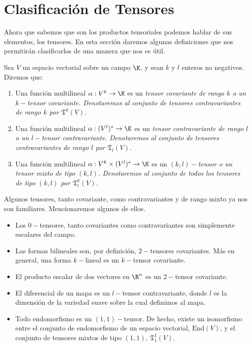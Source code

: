 \section{Clasificación de Tensores}
\label{Sección: Clasificación de Tensores}
Ahora que sabemos que son los productos tensoriales podemos hablar de sus
elementos, los tensores. En esta sección daremos algunas definiciones que
nos permitirán clasificarlos de una manera que nos es útil.

\begin{definition}
	Sea $V$ un espacio vectorial sobre un campo $\K$, y sean $k$ y $l$ enteros no
	negativos. Diremos que:
	\begin{enumerate}
		\item Una función multilineal $\alpha: V^{k} \to \K$ es un \it{tensor
			      covariante de rango $k$} o un \it{$k-$tensor covariante}.
		      Denotaremos al conjunto de tensores contravariantes de rango $k$ por
		      $\mathfrak{T}^k(V)$.
		\item Una función multilineal $\alpha: (V^l)^* \to \K$ es un \it{tensor
			      contravariante de rango $l$} o un \it{$l-$tensor contravariante}.
		      Denotaremos al conjunto de tensores contravariantes de rango $l$ por
		      $\mathfrak{T}_l(V)$.
		\item Una función multilineal $\alpha: V^k \times (V^l)^* \to \K$ es un
		      \it{$(k,l)-$tensor} o un \it{tensor mixto de tipo $(k,l)$}.
		      Denotaremos al conjunto de todos los tensores de tipo $(k,l)$ por
		      $\mathfrak{T}_{l}^{k}(V)$.
	\end{enumerate}
\end{definition}

\begin{example}
	Algunos tensores, tanto covariante, como contravariantes y de rango mixto ya
	nos son familiares. Mencionaremos algunos de ellos.
	\begin{itemize}
		\item Los $0-$tensores, tanto covariantes como contravariantes son
		      simplemente escalares del campo.
		\item Las formas bilineales son, por definición, $2-$tensores covariantes.
		      Más en general, una forma $k-$lineal es un $k-$tensor covariante.
		\item El producto escalar de dos vectores en $\R^{n}$ es un $2-$tensor
		      covariante.
		\item El diferencial de un mapa es un $l-$tensor contravariante, donde $l$
		      es la dimensión de la variedad suave sobre la cual definimos al mapa.
		\item Todo endomorfismo es un $(1,1)-$tensor. De hecho, existe un
		      isomorfismo entre el conjunto de endomorfismo de un espacio
		      vectorial,
		      $\mathrm{End}(V)$, y el conjunto de tensores mixtos de tipo $(1,1)$,
		      $\mathfrak{T}_{1}^{1}(V)$.
	\end{itemize}
\end{example}

